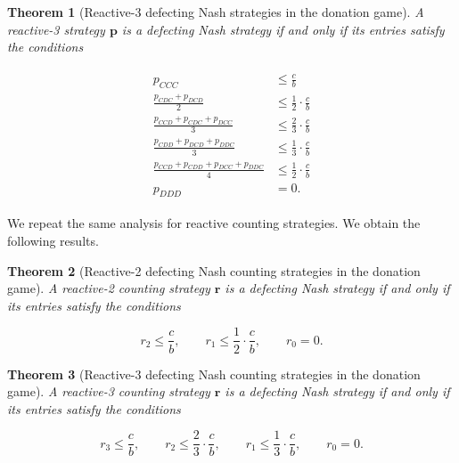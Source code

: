 \documentclass[11pt]{article}
\theoremstyle{plainCl1}
\newtheorem{theorem}{Theorem}
\theoremstyle{plainCl2}
\begin{document}
\begin{theorem}[Reactive-3 defecting Nash strategies in the donation game]
\label{theorem:reactive_three_defecting_strategies}
A reactive-3 strategy $\mathbf{p}$ is a defecting Nash strategy if and only if
its entries satisfy the conditions

\begin{align}\label{eq:defecting_conditions_three}
  \begin{split}
  p_{CCC} & \le \frac{c}{b} \\
  \frac{p_{CDC} + p_{DCD}}{2} & \leq \frac{1}{2} \cdot \frac{c}{b} \\
  \frac{p_{CCD} + p_{CDC} + p_{DCC}}{3} & \leq \frac{2}{3} \cdot \frac{c}{b} \\
  \frac{p_{CDD} + p_{DCD} + p_{DDC}}{3} & \leq \frac{1}{3} \cdot \frac{c}{b} \\
  \frac{p_{CCD} + p_{CDD} + p_{DCC} + p_{DDC}}{4}  & \leq \frac{1}{2} \cdot \frac{c}{b}  \\
  p_{DDD} & = 0.
  \end{split}
\end{align}

\end{theorem}

\noindent
We repeat the same analysis for reactive counting strategies. We obtain the
following results.


\begin{theorem}[Reactive-2 defecting Nash counting strategies in the donation game]
\label{theorem:reactive_two_defecting_counting_strategies}
A reactive-2 counting strategy $\mathbf{r}$ is a defecting Nash strategy if and only if
its entries satisfy the conditions

\begin{equation}\label{eq:defecting_conditions_two_counting}
  r_{2} \le \frac{c}{b}, \qquad \displaystyle r_{1} \le \frac{1}{2} \cdot \frac{c}{b}, \qquad r_{0} = 0.
\end{equation}
\end{theorem}


\begin{theorem}[Reactive-3 defecting Nash counting strategies in the donation game]
\label{theorem:reactive_three_defecting_counting_strategies}
A reactive-3 counting strategy $\mathbf{r}$ is a defecting Nash strategy if and only if
its entries satisfy the conditions

\begin{equation}\label{eq:defecting_conditions_three_counting}
  r_{3} \le \frac{c}{b}, \qquad r_{2} \leq\frac{2}{3} \cdot \frac{c}{b}, \qquad
  r_{1} \leq\frac{1}{3} \cdot \frac{c}{b}, \qquad
  r_{0} = 0.
\end{equation}
\end{theorem}
\end{document}
